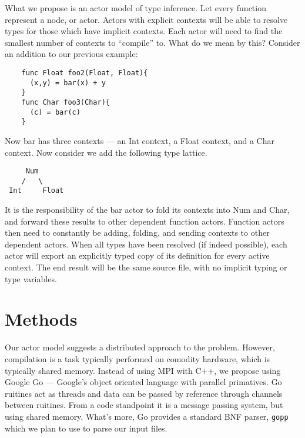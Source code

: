 \documentclass{article}[9pt]
\newenvironment{Figure}
  {\par\medskip\noindent\minipage{\linewidth}}
  {\endminipage\par\medskip}
\begin{document}
\begin{multicols}{2}
What we propose is an actor model of type inference. Let every
function represent a node, or actor. Actors with explicit contexts
will be able to resolve types for those which have implicit
contexts. Each actor will need to find the smallest number of contexts
to ``compile'' to. What do we mean by this? Consider an addition to our
previous example: 
\begin{Figure}
  \begin{lstlisting}
    func Float foo2(Float, Float){
      (x,y) = bar(x) + y
    }
    func Char foo3(Char){
      (c) = bar(c)
    }
  \end{lstlisting}
\end{Figure}
\noindent Now bar has three contexts --- an Int context, a Float context, and a
Char context. Now consider we add the following type lattice. 
\begin{Figure}
  \begin{center}
\begin{BVerbatim}
     Num
    /   \
 Int     Float
\end{BVerbatim}
\end{center}
\end{Figure}

It is the responsibility of the bar actor to fold its contexts into
Num and Char, and forward these results to other dependent function
actors. Function actors then need to constantly be adding, folding,
and sending contexts to other dependent actors. 
When all types have been resolved (if indeed possible), each actor
will export an explicitly typed copy of its definition for every
active context. The end result will be the same source file, with no
implicit typing or type variables. 

\section*{Methods}
Our actor model suggests a distributed approach to the
problem. However, compilation is a task typically performed on
comodity hardware, which is typically shared memory. Instead of using
MPI with C++, we propose using Google Go --- Google's object oriented
language with parallel primatives. Go ruitines act as threads and data
can be passed by reference through channels between ruitines. From a
code standpoint it is a message passing system, but using shared
memory. What's more, Go provides a standard BNF parser, \texttt{gopp}
which we plan to use to parse our input files.


\end{multicols}
\end{document}

